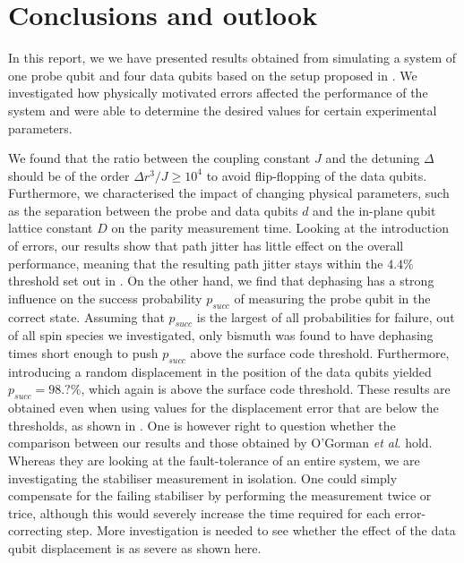 
\section{Conclusions and outlook } \label{sec:conclusions}
In this report, we we have presented results obtained from simulating a system of one probe qubit and four data qubits based on the setup proposed in \cite{OGorman2016}. We investigated how physically motivated errors affected the performance of the system and were able to determine the desired values for certain experimental parameters. 

We found that the ratio between the coupling constant $J$ and the detuning $\Delta$ should be of the order $\Delta r^3/J \ge 10^4$ to avoid flip-flopping of the data qubits. Furthermore, we characterised the impact of changing physical parameters, such as the separation between the probe and data qubits $d$ and the in-plane qubit lattice constant $D$ on the parity measurement time.  
Looking at the introduction of errors, our results show that path jitter has little effect on the overall performance, meaning that the resulting path jitter stays within the $4.4\%$ threshold set out in \cite{OGorman2016}. On the other hand, we find that dephasing has a strong influence on the success probability $p_{succ}$ of measuring the probe qubit in the correct state. Assuming that $p_{succ}$ is the largest of all probabilities for failure, out of all spin species we investigated, only bismuth was found to have dephasing times short enough to push $p_{succ}$ above the surface code threshold. Furthermore, introducing a random displacement in the position of the data qubits yielded $p_{succ} = 98.? \%$, which  again is above the surface code threshold. These results are obtained even when using values for the displacement error that are below the thresholds, as shown in \cite{OGorman2016}. One is however right to question whether the comparison between our results and those obtained by O'Gorman \textit{et al}. hold. Whereas they are looking at the fault-tolerance of an entire system, we are investigating the stabiliser measurement in isolation. One could simply compensate for the failing stabiliser by performing the measurement twice or trice, although this would severely increase the time required for each error-correcting step. More investigation is needed to see whether the effect of the data qubit displacement is as severe as shown here. 






